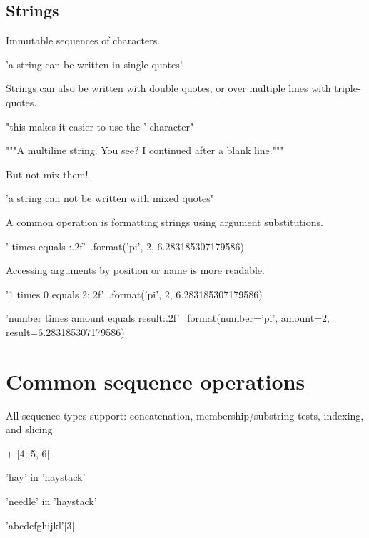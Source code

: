 \documentclass[aspectratio=1610,slidestop]{beamer}
\begin{document}
\subsection{Strings}
\begin{pframe}
Immutable sequences of characters.
\begin{pyconsole}
'a string can be written in single quotes'
\end{pyconsole}
\medskip
\medskip
Strings can also be written with double quotes, or over multiple lines with
triple-quotes.
\begin{pyconsole}
"this makes it easier to use the ' character"
\end{pyconsole}
\medskip
\begin{pyconsole}
"""A multiline string.
You see? I continued after a blank line."""
\end{pyconsole}
\end{pframe}

\begin{pframe}
But not mix them!
\begin{pyconsole}
'a string can not be written with mixed quotes"
\end{pyconsole}
\end{pframe}

\begin{pframe}
 A common operation is formatting strings using argument substitutions.
\begin{pyconsole}
'{} times {} equals {:.2f}'\
    .format('pi', 2, 6.283185307179586)
\end{pyconsole}
\medskip
\medskip
 Accessing arguments by position or name is more readable.
\begin{pyconsole}
'{1} times {0} equals {2:.2f}'\
    .format('pi', 2, 6.283185307179586)

'{number} times {amount} equals {result:.2f}'\
    .format(number='pi', amount=2, result=6.283185307179586)
\end{pyconsole}
\end{pframe}


\section{Common sequence operations}

\begin{pframe}
 All sequence types support: concatenation, membership/substring tests,
 indexing, and slicing.
\begin{pyconsole}
[1, 2, 3] + [4, 5, 6]

'hay' in 'haystack'

'needle' in 'haystack'

'abcdefghijkl'[3]
\end{pyconsole}
\end{pframe}
\end{document}

